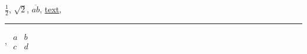 \documentclass[border=3pt]{standalone}
\begin{document}
$\frac{1}{2}$, $\sqrt{2}$, $\overline{ab}$, \underline{text}, \rule{1cm}{0.4pt},
$\begin{array}{c|c} a & b \\ \hline c & d \end{array}$
\end{document}
